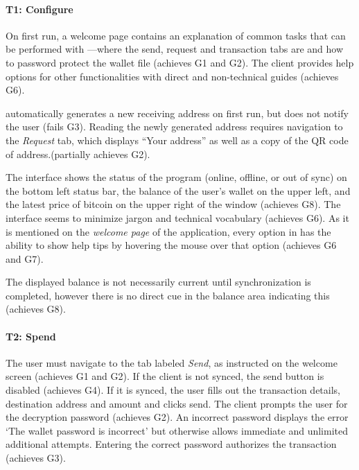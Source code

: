 \paragraph{T1: Configure} On first run, a welcome page contains an explanation of common tasks that can be performed with \multibit---where the send, request and transaction tabs are and how to password protect the wallet file (achieves G1 and G2). The client provides help options for other functionalities with direct and non-technical guides (achieves G6). 

\multibit automatically generates a new receiving address on first run, but does not notify the user (fails G3). Reading the newly generated address requires navigation to the \emph{Request} tab, which displays ``Your address'' as well as a copy of the QR code of address.(partially achieves G2).

The interface shows the status of the program (online, offline, or out of sync) on the bottom left status bar, the balance of the user's wallet on the upper left, and the latest price of bitcoin on the upper right of the window (achieves G8). The interface seems to minimize jargon and technical vocabulary (achieves G6). As it is mentioned on the \emph{welcome page} of the application, every option in \multibit has the ability to show help tips by hovering the mouse over that option (achieves G6 and G7).

The displayed balance is not necessarily current until synchronization is completed, however there is no direct cue in the balance area indicating this (achieves G8).

\paragraph{T2: Spend} The user must navigate to the tab labeled \emph{Send}, as instructed on the welcome screen (achieves G1 and G2). If the client is not synced, the send button is disabled (achieves G4). If it is synced, the user fills out the transaction details, destination address and amount and clicks send. The client prompts the user for the decryption password (achieves G2). An incorrect password displays the error `The wallet password is incorrect' but otherwise allows immediate and unlimited additional attempts. Entering the correct password authorizes the transaction (achieves G3).


